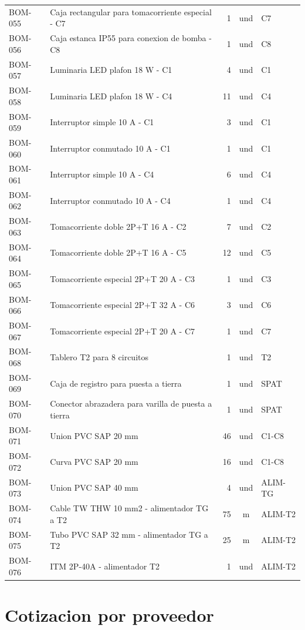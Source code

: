 \begin{longtable}{p{1.7cm}p{7.5cm}r c p{2.2cm}}
BOM-055 & Caja rectangular para tomacorriente especial - C7 & 1 & und & C7 \\
BOM-056 & Caja estanca IP55 para conexion de bomba - C8 & 1 & und & C8 \\
BOM-057 & Luminaria LED plafon 18 W - C1 & 4 & und & C1 \\
BOM-058 & Luminaria LED plafon 18 W - C4 & 11 & und & C4 \\
BOM-059 & Interruptor simple 10 A - C1 & 3 & und & C1 \\
BOM-060 & Interruptor conmutado 10 A - C1 & 1 & und & C1 \\
BOM-061 & Interruptor simple 10 A - C4 & 6 & und & C4 \\
BOM-062 & Interruptor conmutado 10 A - C4 & 1 & und & C4 \\
BOM-063 & Tomacorriente doble 2P+T 16 A - C2 & 7 & und & C2 \\
BOM-064 & Tomacorriente doble 2P+T 16 A - C5 & 12 & und & C5 \\
BOM-065 & Tomacorriente especial 2P+T 20 A - C3 & 1 & und & C3 \\
BOM-066 & Tomacorriente especial 2P+T 32 A - C6 & 3 & und & C6 \\
BOM-067 & Tomacorriente especial 2P+T 20 A - C7 & 1 & und & C7 \\
BOM-068 & Tablero T2 para 8 circuitos & 1 & und & T2 \\
BOM-069 & Caja de registro para puesta a tierra & 1 & und & SPAT \\
BOM-070 & Conector abrazadera para varilla de puesta a tierra & 1 & und & SPAT \\
BOM-071 & Union PVC SAP 20 mm & 46 & und & C1-C8 \\
BOM-072 & Curva PVC SAP 20 mm & 16 & und & C1-C8 \\
BOM-073 & Union PVC SAP 40 mm & 4 & und & ALIM-TG \\
BOM-074 & Cable TW THW 10 mm2 - alimentador TG a T2 & 75 & m & ALIM-T2 \\
BOM-075 & Tubo PVC SAP 32 mm - alimentador TG a T2 & 25 & m & ALIM-T2 \\
BOM-076 & ITM 2P-40A - alimentador T2 & 1 & und & ALIM-T2 \\
\bottomrule\end{longtable}\normalsize

\section{Cotizacion por proveedor}
